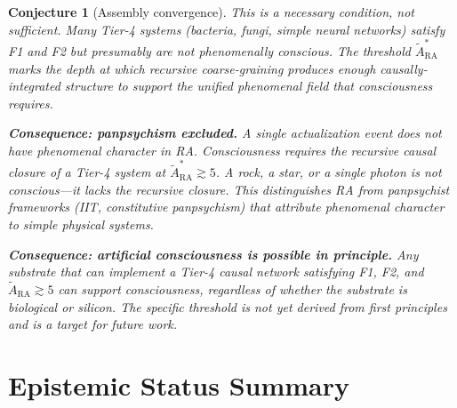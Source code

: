 \documentclass[11pt]{article}
\newtheorem{conjecture}{Conjecture}
\begin{document}
\begin{conjecture}[Assembly convergence]
This is a necessary condition, not sufficient. Many Tier-4 systems (bacteria, fungi, simple neural networks) satisfy F1 and F2 but presumably are not phenomenally conscious. The threshold $\tilde{A}_{\mathrm{RA}}^*$ marks the depth at which recursive coarse-graining produces enough causally-integrated structure to support the unified phenomenal field that consciousness requires.

\textbf{Consequence: panpsychism excluded.} A single actualization event does not have phenomenal character in RA. Consciousness requires the recursive causal closure of a Tier-4 system at $\tilde{A}_{\mathrm{RA}}^* \gtrsim 5$. A rock, a star, or a single photon is not conscious---it lacks the recursive closure. This distinguishes RA from panpsychist frameworks (IIT, constitutive panpsychism) that attribute phenomenal character to simple physical systems.

\textbf{Consequence: artificial consciousness is possible in principle.} Any substrate that can implement a Tier-4 causal network satisfying F1, F2, and $\tilde{A}_{\mathrm{RA}} \gtrsim 5$ can support consciousness, regardless of whether the substrate is biological or silicon. The specific threshold is not yet derived from first principles and is a target for future work.

\section{Epistemic Status Summary}
\label{sec:status}


\end{conjecture}
\end{document}
